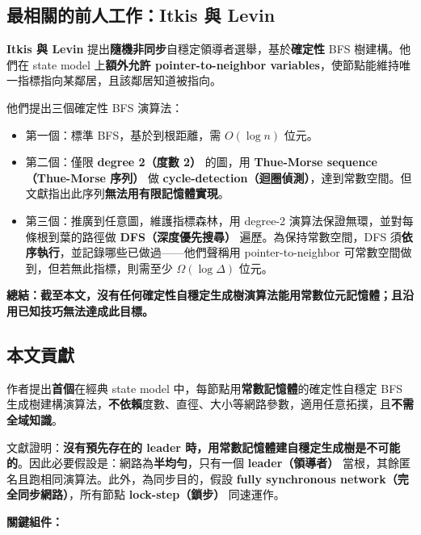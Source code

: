 \documentclass[a4paper, 12pt]{article}
\begin{document}
\subsection{最相關的前人工作：Itkis 與 Levin}
\label{subsec:intro-itkis-levin}

\textbf{Itkis 與 Levin} 提出\textbf{隨機非同步}自穩定領導者選舉，基於\textbf{確定性} BFS 樹建構。他們在 state model 上\textbf{額外允許 pointer-to-neighbor variables}，使節點能維持唯一指標指向某鄰居，且該鄰居知道被指向。

他們提出三個確定性 BFS 演算法：
\begin{itemize}
    \item 第一個：標準 BFS，基於到根距離，需 $O(\log n)$ 位元。
    \item 第二個：僅限 \textbf{degree 2（度數 2）} 的圖，用 \textbf{Thue-Morse sequence（Thue-Morse 序列）} 做 \textbf{cycle-detection（迴圈偵測）}，達到常數空間。但文獻指出此序列\textbf{無法用有限記憶體實現}。
    \item 第三個：推廣到任意圖，維護指標森林，用 degree-2 演算法保證無環，並對每條根到葉的路徑做 \textbf{DFS（深度優先搜尋）} 遍歷。為保持常數空間，DFS 須\textbf{依序執行}，並記錄哪些已做過——他們聲稱用 pointer-to-neighbor 可常數空間做到，但若無此指標，則需至少 $\Omega(\log\Delta)$ 位元。
\end{itemize}

\textbf{總結：截至本文，沒有任何確定性自穩定生成樹演算法能用常數位元記憶體；且沿用已知技巧無法達成此目標。}

\subsection{本文貢獻}
\label{subsec:intro-contribution}

作者提出\textbf{首個}在經典 state model 中，每節點用\textbf{常數記憶體}的確定性自穩定 BFS 生成樹建構演算法，\textbf{不依賴}度數、直徑、大小等網路參數，適用任意拓撲，且\textbf{不需全域知識}。

文獻證明：\textbf{沒有預先存在的 leader 時，用常數記憶體建自穩定生成樹是不可能的}。因此必要假設是：網路為\textbf{半均勻}，只有一個 \textbf{leader（領導者）} 當根，其餘匿名且跑相同演算法。此外，為同步目的，假設 \textbf{fully synchronous network（完全同步網路）}，所有節點 \textbf{lock-step（鎖步）} 同速運作。

\textbf{關鍵組件：}
\end{document}
